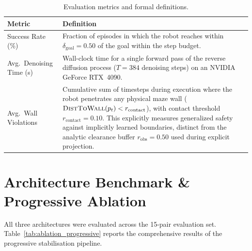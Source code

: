 \documentclass[12pt, a4paper, oneside]{report}
\theoremstyle{definition}
\begin{document}
\begin{table}[H]
\centering
\caption{Evaluation metrics and formal definitions.}
\label{tab:metrics}
\begin{tabularx}{\linewidth}{@{}lX@{}}
\toprule
\textbf{Metric} & \textbf{Definition} \\
\midrule
Success Rate (\%)
  & Fraction of episodes in which the robot reaches within
    $\delta_{\mathrm{goal}} = 0.50$ of the goal within
    the step budget.\\[4pt]
Avg.\ Denoising Time (s)
  & Wall-clock time for a single forward pass of the reverse
    diffusion process ($T=384$ denoising steps)
    on an NVIDIA GeForce RTX~4090.\\[4pt]
Avg.\ Wall Violations
  & Cumulative sum of timesteps during execution where the robot
    penetrates any physical maze wall ($\Call{DistToWall}{p_t} < r_{\mathrm{contact}}$),
    with contact threshold $r_{\mathrm{contact}}=0.10$. This explicitly measures 
    generalized safety against implicitly learned boundaries, distinct from the analytic
    clearance buffer $r_{\mathrm{obs}}=0.50$ used during explicit projection.\\
\bottomrule
\end{tabularx}
\end{table}

\section{Architecture Benchmark \& Progressive Ablation}
\label{sec:benchmark}

All three architectures were evaluated across the 15-pair evaluation set.
Table~\ref{tab:ablation_progressive} reports the comprehensive results
of the progressive stabilisation pipeline.
\end{document}

